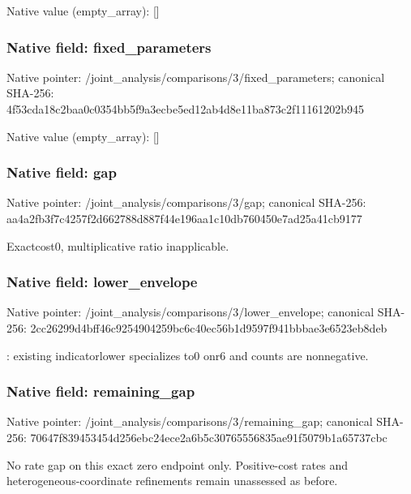 \documentclass[10pt,a4paper]{article}
\begin{document}
Native value (empty\_\allowbreak{}array): []

\subsubsection{Native field: fixed\_\allowbreak{}parameters}
Native pointer: /joint\_\allowbreak{}analysis/comparisons/3/fixed\_\allowbreak{}parameters; canonical SHA-256: 4f53cda18c2baa0c0354bb5f9a3ecbe5ed12ab4d8e11ba873c2f11161202b945

Native value (empty\_\allowbreak{}array): []

\subsubsection{Native field: gap}
Native pointer: /joint\_\allowbreak{}analysis/comparisons/3/gap; canonical SHA-256: aa4a2fb3f7c4257f2d662788d887f44e196aa1c10db760450e7ad25a41cb9177

\begingroup\raggedright\sloppy Exactcost0,\allowbreak{} multiplicative ratio inapplicable.\par\endgroup

\subsubsection{Native field: lower\_\allowbreak{}envelope}
Native pointer: /joint\_\allowbreak{}analysis/comparisons/3/lower\_\allowbreak{}envelope; canonical SHA-256: 2cc26299d4bff46c9254904259bc6c40ec56b1d9597f941bbbae3e6523eb8deb

\begingroup\raggedright{}:\allowbreak{} existing indicatorlower specializes to0 onr6 and counts are nonnegative.\par\endgroup

\subsubsection{Native field: remaining\_\allowbreak{}gap}
Native pointer: /joint\_\allowbreak{}analysis/comparisons/3/remaining\_\allowbreak{}gap; canonical SHA-256: 70647f839453454d256ebc24ece2a6b5c30765556835ae91f5079b1a65737cbc

\begingroup\raggedright\sloppy No rate gap on this exact zero endpoint only. Positive-cost rates and heterogeneous-coordinate refinements remain unassessed as before.\par\endgroup
\end{document}
